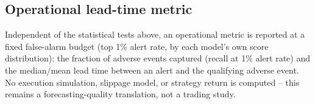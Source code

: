 \subsection{Operational lead-time metric}
\label{sec:methodology-operational}

Independent of the statistical tests above, an operational metric is
reported at a fixed false-alarm budget (top 1\% alert rate, by each
model's own score distribution): the fraction of adverse events captured
(recall at 1\% alert rate) and the median/mean lead time between an
alert and the qualifying adverse event. No execution simulation,
slippage model, or strategy return is computed -- this remains a
forecasting-quality translation, not a trading study.
